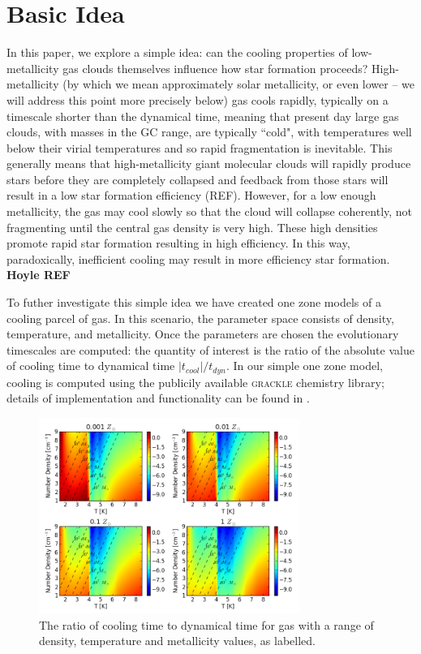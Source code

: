 \documentclass[useAMS,usenatbib]{mn2e}
\begin{document}
%
\section{Basic Idea}
\label{sec:basic}

In this paper, we explore a simple idea: can the cooling properties of low-metallicity gas clouds themselves influence how star formation proceeds?  High-metallicity (by which we mean approximately solar metallicity, or even lower -- we will address this point more precisely below) gas cools rapidly, typically on a timescale shorter than the dynamical time, meaning that present day large gas clouds, with masses in the GC range, are typically ``cold", with temperatures well below their virial temperatures and so rapid fragmentation is inevitable.  This generally means that high-metallicity giant molecular clouds will rapidly produce stars before they are completely collapsed and feedback from those stars will result in a low star formation efficiency (REF).  However, for a low enough metallicity, the gas may cool slowly so that the cloud will collapse coherently, not fragmenting until the central gas density is very high.  These high densities promote rapid star formation resulting in high efficiency.  In this way, paradoxically, inefficient cooling may result in more efficiency star formation.  {\bf Hoyle REF}

To futher investigate this simple idea we have created one zone models of a cooling parcel of gas. In 
this scenario, the parameter space consists of density, temperature, and metallicity. Once the parameters
are chosen the evolutionary timescales are computed: the quantity of interest is the ratio of the absolute value of cooling
time to dynamical time $|t_{cool}|/t_{dyn}$. In our simple one zone model, cooling is computed using the
publicily available \textsc{grackle} chemistry library; details of implementation and functionality can be found
in \cite{Bryan2014}.
\begin{figure}
\begin{center}
\mbox{\includegraphics[width=8.5cm]{Images/cooling_to_freefall_no_background}}
\end{center}
\caption{\label{fig:cooling_to_freefall} The ratio of cooling time to dynamical time for gas with a range of density, temperature and metallicity values, as labelled.}
\end{figure}
\end{document}
